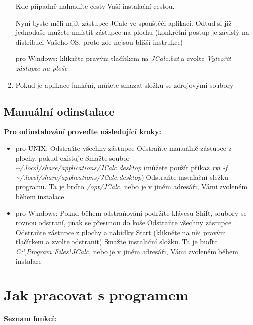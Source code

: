 \documentclass[a4paper, 11pt]{article}
\begin{document}
\begin{enumerate}
			\subsubitem Kde případně nahradíte cesty Vaší instalační cestou.

			\subsubitem Nyní byste měli najít zástupce JCalc ve spouštěči aplikací. Odtud si již jednoduše můžete umístit zástupce na plochu (konkrétní postup je závislý na distribuci Vašeho OS, proto zde nejsou bližší instrukce)

		\subitem pro Windows:
			\subsubitem klikněte pravým tlačítkem na \emph{JCalc.bat} a zvolte \emph{Vytvořit zástupce na ploše}


	\item Pokud je aplikace funkční, můžete smazat složku se zdrojovými soubory
\end{enumerate}

\subsection{Manuální odinstalace}

\textbf{Pro odinstalování proveďte následující kroky:}

\begin{itemize}
	\item pro UNIX:
		\subitem Odstraňte všechny zástupce
			\subsubitem Odstraňte manuálně zástupce z plochy, pokud existuje
			\subsubitem Smažte soubor \emph{\textasciitilde/.local/share/applications/JCalc.desktop}
			\subsubitem (můžete použít příkaz \emph{rm -f \textasciitilde/.local/share/applications/JCalc.desktop})
		\subitem Odstraňte instalační složku programu. Ta je buďto \emph{/opt/JCalc}, nebo je v jiném adresáři, Vámi zvoleném během instalace

	\item pro Windows:
		\subitem Pokud během odstraňování podržíte klávesu Shift, soubory se rovnou odstraní, jinak se přesunou do koše
		\subitem Odstraňte všechny zástupce
			\subsubitem Odstraňte zástupce z plochy a nabídky Start (klikněte na něj pravým tlačítkem a zvolte odstranit)
		\subitem Smažte instalační složku. Ta je buďto \emph{C:\textbackslash Program Files\textbackslash JCalc}, nebo je v jiném adresáři, Vámi zvoleném během instalace
\end{itemize}

\section{Jak pracovat s programem}

\textbf{Seznam funkcí:}
\end{document}
